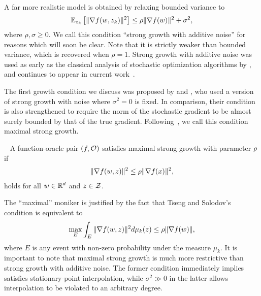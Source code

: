 A far more realistic model is obtained by relaxing bounded variance to 
\[ \Ek \sbr{\norm{\grad(\w, \zk)}^2} \leq \rho \norm{\grad(\w)}^2 + \sigma^2,  \]
where \( \rho, \sigma \geq 0 \).
We call this condition ``strong growth with additive noise'' for reasons which will soon be clear.
Note that it is strictly weaker than bounded variance, which is recovered when \( \rho = 1 \).
Strong growth with additive noise was used as early as the classical analysis of stochastic optimization algorithms by \citet{poljak1973pseudogradient}, and continues to appear in current work~\citep{bertsekas2000gradient, khaled2020better, nguyen2018sgd}. 


The first growth condition we discuss was proposed by \citet{tseng1998incremental} and \citet{solodov1998incremental}, who used a version of strong growth with noise where \( \sigma^2 = 0 \) is fixed. 
In comparison, their condition is also strengthened to require the norm of the stochastic gradient to be almost surely bounded by that of the true gradient.
Following~\citet{khaled2020better}, we call this condition maximal strong growth.
\begin{definition}~\label{def:maximal-sg}
    A function-oracle pair \( \rbr{f, \oracle{}} \) satisfies maximal strong growth with parameter \( \sgc \) if  
    \begin{align*}
        \norm{\grad(\w, \z)}^2 \leq \sgc \norm{\grad(x)}^2, 
    \end{align*}
    holds for all \( \w \in \R^d \) and \( \z \in \calZ \).
\end{definition}
\noindent The ``maximal'' moniker is justified by the fact that Tseng and Solodov's condition is equivalent to 
    \[ \max_{E} \int_{E} \norm{\grad(\w, \z)}^2 d\mu_k(\z) \leq \sgc \norm{\grad(\w)}, \]
where \( E \) is any event with non-zero probability under the measure \( \mu_k \). 
It is important to note that maximal strong growth is much more restrictive than strong growth with additive noise.
The former condition immediately implies \oracle{} satisfies stationary-point interpolation, while \( \sigma^2 \gg 0 \) in the latter allows interpolation to be violated to an arbitrary degree. 


